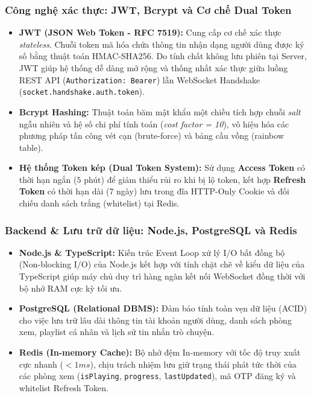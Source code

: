 \documentclass[12pt,a4paper]{extarticle}
\begin{document}
\subsubsection{Công nghệ xác thực: JWT, Bcrypt và Cơ chế Dual Token}
\begin{itemize}[leftmargin=1.2cm]
    \item \textbf{JWT (JSON Web Token - RFC 7519):} Cung cấp cơ chế xác thực \textit{stateless}. Chuỗi token mã hóa chứa thông tin nhận dạng người dùng được ký số bằng thuật toán HMAC-SHA256. Do tính chất không lưu phiên tại Server, JWT giúp hệ thống dễ dàng mở rộng và thống nhất xác thực giữa luồng REST API (\texttt{Authorization: Bearer}) lẫn WebSocket Handshake (\texttt{socket.handshake.auth.token}).
    \item \textbf{Bcrypt Hashing:} Thuật toán băm mật khẩu một chiều tích hợp chuỗi \textit{salt} ngẫu nhiên và hệ số chi phí tính toán (\textit{cost factor = 10}), vô hiệu hóa các phương pháp tấn công vét cạn (brute-force) và bảng cầu vồng (rainbow table).
    \item \textbf{Hệ thống Token kép (Dual Token System):} Sử dụng \textbf{Access Token} có thời hạn ngắn ($5$ phút) để giảm thiểu rủi ro khi bị lộ token, kết hợp \textbf{Refresh Token} có thời hạn dài ($7$ ngày) lưu trong đĩa HTTP-Only Cookie và đối chiếu danh sách trắng (whitelist) tại Redis.
\end{itemize}


\subsubsection{Backend \& Lưu trữ dữ liệu: Node.js, PostgreSQL và Redis}
\begin{itemize}[leftmargin=1.2cm]
    \item \textbf{Node.js \& TypeScript:} Kiến trúc Event Loop xử lý I/O bất đồng bộ (Non-blocking I/O) của Node.js kết hợp với tính chặt chẽ về kiểu dữ liệu của TypeScript giúp máy chủ duy trì hàng ngàn kết nối WebSocket đồng thời với bộ nhớ RAM cực kỳ tối ưu.
    \item \textbf{PostgreSQL (Relational DBMS):} Đảm bảo tính toàn vẹn dữ liệu (ACID) cho việc lưu trữ lâu dài thông tin tài khoản người dùng, danh sách phòng xem, playlist cá nhân và lịch sử tin nhắn trò chuyện.
    \item \textbf{Redis (In-memory Cache):} Bộ nhớ đệm In-memory với tốc độ truy xuất cực nhanh ($<1ms$), chịu trách nhiệm lưu giữ trạng thái phát tức thời của các phòng xem (\texttt{isPlaying}, \texttt{progress}, \texttt{lastUpdated}), mã OTP đăng ký và whitelist Refresh Token.
\end{itemize}
\end{document}
